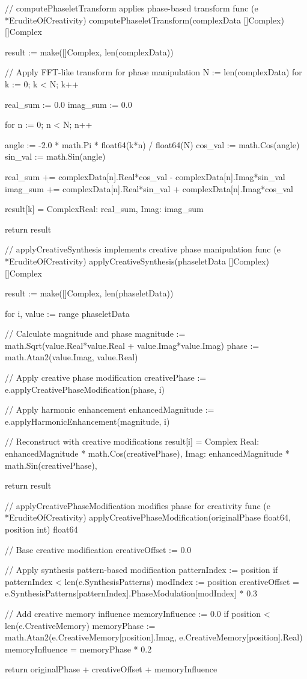 // computePhaseletTransform applies phase-based transform
func (e *EruditeOfCreativity) computePhaseletTransform(complexData []Complex) []Complex {
    result := make([]Complex, len(complexData))
    
    // Apply FFT-like transform for phase manipulation
    N := len(complexData)
    for k := 0; k < N; k++ {
        real_sum := 0.0
        imag_sum := 0.0
        
        for n := 0; n < N; n++ {
            angle := -2.0 * math.Pi * float64(k*n) / float64(N)
            cos_val := math.Cos(angle)
            sin_val := math.Sin(angle)
            
            real_sum += complexData[n].Real*cos_val - complexData[n].Imag*sin_val
            imag_sum += complexData[n].Real*sin_val + complexData[n].Imag*cos_val
        }
        
        result[k] = Complex{Real: real_sum, Imag: imag_sum}
    }
    
    return result
}

// applyCreativeSynthesis implements creative phase manipulation
func (e *EruditeOfCreativity) applyCreativeSynthesis(phaseletData []Complex) []Complex {
    result := make([]Complex, len(phaseletData))
    
    for i, value := range phaseletData {
        // Calculate magnitude and phase
        magnitude := math.Sqrt(value.Real*value.Real + value.Imag*value.Imag)
        phase := math.Atan2(value.Imag, value.Real)
        
        // Apply creative phase modification
        creativePhase := e.applyCreativePhaseModification(phase, i)
        
        // Apply harmonic enhancement
        enhancedMagnitude := e.applyHarmonicEnhancement(magnitude, i)
        
        // Reconstruct with creative modifications
        result[i] = Complex{
            Real: enhancedMagnitude * math.Cos(creativePhase),
            Imag: enhancedMagnitude * math.Sin(creativePhase),
        }
    }
    
    return result
}

// applyCreativePhaseModification modifies phase for creativity
func (e *EruditeOfCreativity) applyCreativePhaseModification(originalPhase float64, position int) float64 {
    // Base creative modification
    creativeOffset := 0.0
    
    // Apply synthesis pattern-based modification
    patternIndex := position %
    if patternIndex < len(e.SynthesisPatterns) {
        modIndex := position %
        creativeOffset = e.SynthesisPatterns[patternIndex].PhaseModulation[modIndex] * 0.3
    }
    
    // Add creative memory influence
    memoryInfluence := 0.0
    if position < len(e.CreativeMemory) {
        memoryPhase := math.Atan2(e.CreativeMemory[position].Imag, e.CreativeMemory[position].Real)
        memoryInfluence = memoryPhase * 0.2
    }
    
    return originalPhase + creativeOffset + memoryInfluence
}

